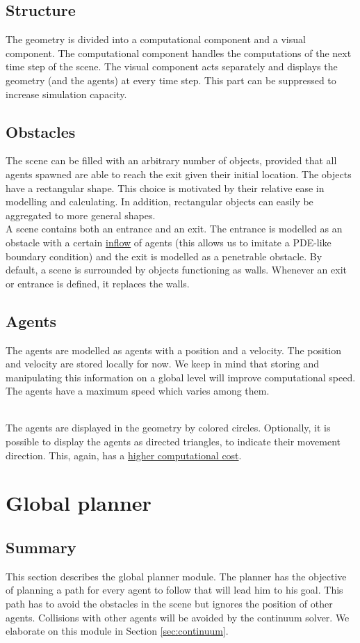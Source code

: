 \documentclass{article}
\begin{document}
\subsection{Structure}
The geometry is divided into a computational component and a visual component. The computational component handles the computations of the next time step of the scene. The visual component acts separately and displays the geometry (and the agents) at every time step. This part can be suppressed to increase simulation capacity.

\subsection{Obstacles}
The scene can be filled with an arbitrary number of objects, provided that all agents spawned are able to reach the exit given their initial location. The objects have a rectangular shape. This choice is motivated by their relative ease in modelling and calculating. In addition, rectangular objects can easily be aggregated to more general shapes.
\ \\
A scene contains both an entrance and an exit. The entrance is modelled as an obstacle with a certain \underline{inflow} of agents (this allows us to imitate a PDE-like boundary condition) and the exit is modelled as a penetrable obstacle. By default, a scene is surrounded by objects functioning as walls. Whenever an exit or entrance is defined, it replaces the walls.
\subsection{Agents}
The agents are modelled as agents with a position and a velocity. The position and velocity are stored locally for now. We keep in mind that storing and manipulating this information on a global level will improve computational speed.
The agents have a maximum speed which varies among them.

\ \\
The agents are displayed in the geometry by colored circles. Optionally, it is possible to display the agents as directed triangles, to indicate their movement direction. This, again, has a \underline{higher computational cost}.
\newpage
\section{Global planner}
\subsection{Summary}
This section describes the global planner module. The planner has the objective of planning a path for every agent to follow that will lead him to his goal. This path has to avoid the obstacles in the scene but ignores the position of other agents. Collisions with other agents will be avoided by the continuum solver. We elaborate on this module in Section \ref{sec:continuum}.
\end{document}

